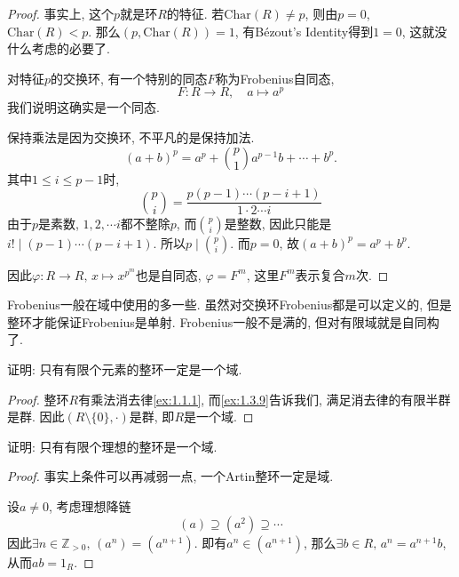 \begin{proof}
    事实上, 这个$p$就是环$R$的特征. 若$\mathrm{Char}(R) \neq p$, 则由$p = 0$, $\mathrm{Char}(R) < p$. 那么$(p, \mathrm{Char}(R)) = 1$, 有Bézout's Identity得到$1 = 0$, 这就没什么考虑的必要了.

    对特征$p$的交换环, 有一个特别的同态$F$称为Frobenius自同态,
    \[
        F: R \to R, \quad a \mapsto a^p
    \]
    我们说明这确实是一个同态.
    
    保持乘法是因为交换环, 不平凡的是保持加法.
    \[
        (a + b)^p = a^p + \binom{p}{1}a^{p - 1}b + \cdots + b^p.
    \]
    其中$1 \leqslant i \leqslant p - 1$时,
    \[
        \binom{p}{i} = \frac{p(p - 1) \cdots (p - i + 1)}{1 \cdot 2 \cdots i} 
    \]
    由于$p$是素数, $1, 2, \cdots i$都不整除$p$, 而$\binom{p}{i}$是整数, 因此只能是$i! \mid (p - 1) \cdots (p - i + 1)$. 所以$p \mid \binom{p}{i}$. 而$p = 0$, 故$(a + b)^p = a^p + b^p$.

    因此$\varphi: R \to R,\, x \mapsto x^{p^m}$也是自同态, $\varphi = F^m$, 这里$F^m$表示复合$m$次.
\end{proof}

\begin{remark}
    Frobenius一般在域中使用的多一些. 虽然对交换环Frobenius都是可以定义的, 但是整环才能保证Frobenius是单射. Frobenius一般不是满的, 但对有限域就是自同构了.
\end{remark}

\begin{problem}
    证明: 只有有限个元素的整环一定是一个域.
\end{problem}

\begin{proof}
    整环$R$有乘法消去律\ref{ex:1.1.1}, 而\ref{ex:1.3.9}告诉我们, 满足消去律的有限半群是群. 因此$(R \setminus \{0\}, \cdot)$是群, 即$R$是一个域.
\end{proof}

\begin{problem}\label{ex:2.1.4}
    证明: 只有有限个理想的整环是一个域.
\end{problem}

\begin{proof}
    事实上条件可以再减弱一点, 一个Artin整环一定是域.

    设$a \neq 0$, 考虑理想降链
    \[
        (a) \supseteq (a^2) \supseteq \cdots 
    \]
    因此$\exists n \in \mathbb{Z}_{>0},\, (a^n) = (a^{n + 1})$. 即有$a^n \in (a^{n + 1})$, 那么$\exists b \in R,\, a^n = a^{n + 1}b$, 从而$ab = 1_R$.
\end{proof}

